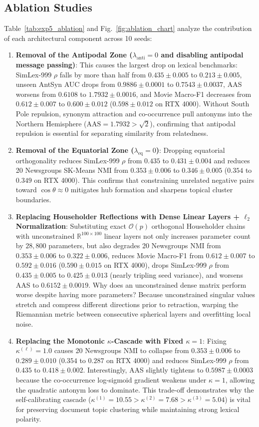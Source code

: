 \documentclass[journal]{IEEEtran}
\begin{document}
\subsection{Ablation Studies}
Table~\ref{tab:exp5_ablation} and Fig.~\ref{fig:ablation_chart} analyze the contribution of each architectural component across 10 seeds:
\begin{enumerate}
    \item \textbf{Removal of the Antipodal Zone ($\lambda_{\text{anti}} = 0$ and disabling antipodal message passing)}: This causes the largest drop on lexical benchmarks: SimLex-999 $\rho$ falls by more than half from $0.435 \pm 0.005$ to $0.213 \pm 0.005$, unseen AntSyn AUC drops from $0.9886 \pm 0.0001$ to $0.7543 \pm 0.0037$, AAS worsens from $0.6108$ to $1.7932 \pm 0.0016$, and Movie Macro-F1 decreases from $0.612 \pm 0.007$ to $0.600 \pm 0.012$ ($0.598 \pm 0.012$ on RTX 4000). Without South Pole repulsion, synonym attraction and co-occurrence pull antonyms into the Northern Hemisphere ($\text{AAS} = 1.7932 > \sqrt{2}$), confirming that antipodal repulsion is essential for separating similarity from relatedness.
    \item \textbf{Removal of the Equatorial Zone ($\lambda_{\text{eq}} = 0$)}: Dropping equatorial orthogonality reduces SimLex-999 $\rho$ from $0.435$ to $0.431 \pm 0.004$ and reduces 20 Newsgroups SK-Means NMI from $0.353 \pm 0.006$ to $0.346 \pm 0.005$ ($0.354$ to $0.349$ on RTX 4000). This confirms that constraining unrelated negative pairs toward $\cos\theta \approx 0$ mitigates hub formation and sharpens topical cluster boundaries.
    \item \textbf{Replacing Householder Reflections with Dense Linear Layers + $\ell_2$ Normalization}: Substituting exact $\mathcal{O}(p)$ orthogonal Householder chains with unconstrained $\mathbb{R}^{100 \times 100}$ linear layers not only increases parameter count by $28,800$ parameters, but also degrades 20 Newsgroups NMI from $0.353 \pm 0.006$ to $0.322 \pm 0.006$, reduces Movie Macro-F1 from $0.612 \pm 0.007$ to $0.592 \pm 0.016$ ($0.590 \pm 0.015$ on RTX 4000), drops SimLex-999 $\rho$ from $0.435 \pm 0.005$ to $0.425 \pm 0.013$ (nearly tripling seed variance), and worsens AAS to $0.6152 \pm 0.0019$. Why does an unconstrained dense matrix perform worse despite having more parameters? Because unconstrained singular values stretch and compress different directions prior to retraction, warping the Riemannian metric between consecutive spherical layers and overfitting local noise.
    \item \textbf{Replacing the Monotonic $\kappa$-Cascade with Fixed $\kappa = 1$}: Fixing $\kappa^{(\ell)} = 1.0$ causes 20 Newsgroups NMI to collapse from $0.353 \pm 0.006$ to $0.289 \pm 0.010$ ($0.354$ to $0.287$ on RTX 4000) and reduces SimLex-999 $\rho$ from $0.435$ to $0.418 \pm 0.002$. Interestingly, AAS slightly tightens to $0.5987 \pm 0.0003$ because the co-occurrence log-sigmoid gradient weakens under $\kappa=1$, allowing the quadratic antonym loss to dominate. This trade-off demonstrates why the self-calibrating cascade ($\kappa^{(1)} = 10.55 > \kappa^{(2)} = 7.68 > \kappa^{(3)} = 5.04$) is vital for preserving document topic clustering while maintaining strong lexical polarity.

\end{enumerate}
\end{document}

